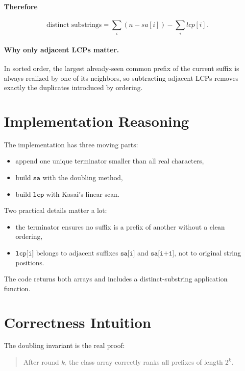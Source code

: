 \paragraph{Therefore}
\[
\text{distinct substrings}
=
\sum_i (n - sa[i]) - \sum_i lcp[i].
\]

\paragraph{Why only adjacent LCPs matter.}
In sorted order, the largest already-seen common prefix of the current suffix is always realized by one of its
neighbors, so subtracting adjacent LCPs removes exactly the duplicates introduced by ordering.

\section*{Implementation Reasoning}

The implementation has three moving parts:

\begin{itemize}
  \item append one unique terminator smaller than all real characters,
  \item build \(\texttt{sa}\) with the doubling method,
  \item build \(\texttt{lcp}\) with Kasai's linear scan.
\end{itemize}

Two practical details matter a lot:

\begin{itemize}
  \item the terminator ensures no suffix is a prefix of another without a clean ordering,
  \item \(\texttt{lcp[i]}\) belongs to adjacent suffixes \(\texttt{sa[i]}\) and \(\texttt{sa[i+1]}\), not to original
  string positions.
\end{itemize}

The code returns both arrays and includes a distinct-substring application function.

\section*{Correctness Intuition}

The doubling invariant is the real proof:

\begin{quote}
After round \(k\), the class array correctly ranks all prefixes of length \(2^k\).
\end{quote}

